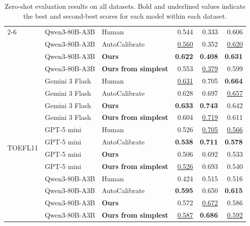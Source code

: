 \begin{table}[t!]
{\begin{tabular}{lllrrr}
\cmidrule(lr){2-6}
 & Qwen3-80B-A3B & Human & 0.544 & 0.333 & 0.606 \\
 & Qwen3-80B-A3B & AutoCalibrate & \underline{0.560} & 0.352 & \underline{0.620} \\
 & Qwen3-80B-A3B & \textbf{Ours} & \textbf{0.622} & \textbf{0.408} & \textbf{0.631} \\
 & Qwen3-80B-A3B & \textbf{Ours from simplest} & 0.553 & \underline{0.379} & 0.599 \\
\midrule
\multirow{12}{*}{TOEFL11} & Gemini 3 Flash & Human & \underline{0.631} & 0.705 & \textbf{0.664} \\
 & Gemini 3 Flash & AutoCalibrate & 0.628 & 0.697 & \underline{0.657} \\
 & Gemini 3 Flash & \textbf{Ours} & \textbf{0.633} & \textbf{0.743} & 0.642 \\
 & Gemini 3 Flash & \textbf{Ours from simplest} & 0.604 & \underline{0.719} & 0.611 \\
\cmidrule(lr){2-6}
 & GPT-5 mini & Human & 0.526 & \underline{0.705} & \underline{0.566} \\
 & GPT-5 mini & AutoCalibrate & \textbf{0.538} & \textbf{0.711} & \textbf{0.578} \\
 & GPT-5 mini & \textbf{Ours} & 0.506 & 0.692 & 0.533 \\
 & GPT-5 mini & \textbf{Ours from simplest} & \underline{0.526} & 0.693 & 0.540 \\
\cmidrule(lr){2-6}
 & Qwen3-80B-A3B & Human & 0.424 & 0.515 & 0.516 \\
 & Qwen3-80B-A3B & AutoCalibrate & \textbf{0.595} & 0.650 & \textbf{0.615} \\
 & Qwen3-80B-A3B & \textbf{Ours} & 0.572 & \underline{0.672} & 0.586 \\
 & Qwen3-80B-A3B & \textbf{Ours from simplest} & \underline{0.587} & \textbf{0.686} & \underline{0.592} \\
\bottomrule
\end{tabular}}
\caption{Zero-shot evaluation results on all datasets. Bold and underlined values indicate the best and second-best scores for each model within each dataset.}
\label{tab:main_results}
\end{table}
